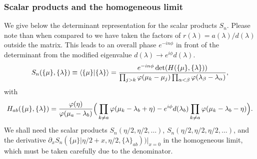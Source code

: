 \documentclass[a4paper,10pt]{article}
\newcommand{\linnea}[1]{$\framebox{\tiny L}$\ \textbf{\texttt{{\color{red}\footnotesize#1}}}}
\begin{document}
\subsubsection{Scalar products and the homogeneous limit}\label{ScalarProducts}

We give below the determinant representation for the scalar products $S_n$. %
Please note than when compared to \cite{Terras} we have taken the factors of $r(\lambda)=a(\lambda)/d(\lambda)$ outside the matrix. This leads to an overall phase $e^{-in\phi}$ in front of the determinant from the modified eigenvalue $d(\lambda)\rightarrow e^{i\phi}d(\lambda)$. 
%
\begin{equation}
\begin{aligned}
S_n(\{\mu\},\{\lambda\}) \equiv \langle \{\mu\}| \{\lambda\}\rangle = \frac{ {\color{black} e^{-in\phi}} \det(H(\{\mu\},\{\lambda\}))}{\prod_{j>k} \varphi(\mu_k-\mu_j) \prod_{\alpha<\beta}\varphi(\lambda_\beta - \lambda_\alpha) },
\end{aligned}
\end{equation}
with 
\begin{equation}\label{Hab}
\begin{aligned}
H_{ab}(\{\mu\},\{\lambda\})=\frac{\varphi(\eta)}{\varphi(\mu_a-\lambda_b)} \Big(\prod_{k\neq a} \varphi(\mu_k-\lambda_b+\eta) - {\color{black} e^{i\phi}} d(\lambda_b) \prod_{k\neq a} \varphi(\mu_k-\lambda_b-\eta)
\Big).
\end{aligned}
\end{equation}
We shall need the scalar products $S_n(\eta/2,\eta/2,\ldots)$, $S_n(\eta/2,\eta/2,\eta/2,\ldots)$, and the derivative $\partial_x S_n(\{\mu\}|\eta/2+x,\eta/2,\{\lambda\}_{ab})\Big)\Big|_{x=0}$ in the homogeneous limit, which must be taken carefully due to the denominator. 
\end{document}
